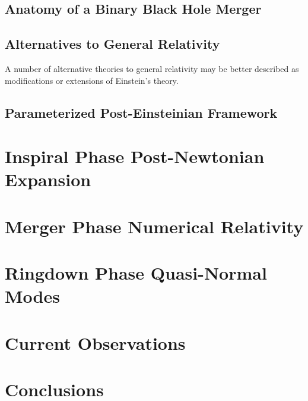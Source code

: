 \documentclass[aps,prd,twocolumn,floatfix,preprintnumbers,altaffilletter,superscriptaddress]{revtex4-1}
\begin{document}
\subsection{Anatomy of a Binary Black Hole Merger} \label{sec:intro_anatomy-bbh}

\subsection{Alternatives to General Relativity} \label{sec:intro_alt-theories}
A number of alternative theories to general relativity may be better described as modifications or extensions of Einstein's theory. 


\subsection{Parameterized Post-Einsteinian Framework} \label{sec:intro_ppE}

\section{Inspiral Phase Post-Newtonian Expansion} \label{sec:inspiral_pn_expansion}

\section{Merger Phase Numerical Relativity} \label{sec:nr_merger}

\section{Ringdown Phase Quasi-Normal Modes} \label{sec:ringdown_qnms}

\section{Current Observations} \label{sec:current_obsv}

\section{Conclusions} \label{sec:conclusion}


{}

\end{document}
